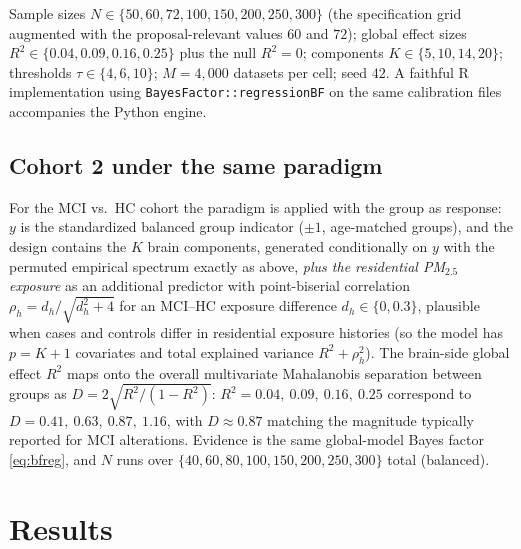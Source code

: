 \documentclass[11pt,a4paper]{article}
\newcommand{\pmf}{PM$_{2.5}$}
\begin{document}
Sample sizes $N\in\{50,60,72,100,150,200,250,300\}$ (the specification grid augmented with the proposal-relevant values $60$ and $72$); global effect sizes $R^{2}\in\{0.04,0.09,0.16,0.25\}$ plus the null $R^{2}=0$; components $K\in\{5,10,14,20\}$; thresholds $\tau\in\{4,6,10\}$; $M=4{,}000$ datasets per cell; seed $42$. A faithful R implementation using \texttt{BayesFactor::regressionBF} on the same calibration files accompanies the Python engine.

\subsection{Cohort 2 under the same paradigm}

For the MCI vs.\ HC cohort the paradigm is applied with the group as response: $y$ is the standardized balanced group indicator ($\pm1$, age-matched groups), and the design contains the $K$ brain components, generated conditionally on $y$ with the permuted empirical spectrum exactly as above, \emph{plus the residential \pmf{} exposure} as an additional predictor with point-biserial correlation $\rho_h=d_h/\sqrt{d_h^{2}+4}$ for an MCI--HC exposure difference $d_h\in\{0,0.3\}$, plausible when cases and controls differ in residential exposure histories (so the model has $p=K+1$ covariates and total explained variance $R^{2}+\rho_h^{2}$). The brain-side global effect $R^{2}$ maps onto the overall multivariate Mahalanobis separation between groups as $D=2\sqrt{R^{2}/(1-R^{2})}$: $R^{2}=0.04,\ 0.09,\ 0.16,\ 0.25$ correspond to $D=0.41,\ 0.63,\ 0.87,\ 1.16$, with $D\approx0.87$ matching the magnitude typically reported for MCI alterations. Evidence is the same global-model Bayes factor \eqref{eq:bfreg}, and $N$ runs over $\{40,60,80,100,150,200,250,300\}$ total (balanced).

\section{Results}
\end{document}
